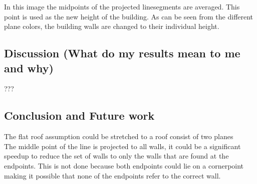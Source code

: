 \documentclass[10pt]{article}
\begin{document}
In this image the midpoints of the projected linesegments are averaged. This
point is used as the new height of the building. As can be seen from the
different plane colors, the building walls are changed to their individual height.

\subsection{Discussion (What do my results mean to me and why)}
???



\subsection{Conclusion and Future work}
The flat roof assumption could be stretched to a roof consist of two planes
\\
The middle point of the line is projected to all walls, it could be a significant speedup to reduce the set of walls to only the walls that are found at the endpoints. This is not done because both endpoints could lie on a cornerpoint making it possible that none of the endpoints refer to the correct wall.





\end{document}
